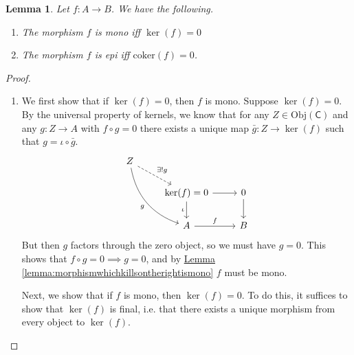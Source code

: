 \documentclass[a4paper,10pt]{scrreprt}
\newcommand{\Obj}{\mathrm{Obj}}
\newcommand{\coker}{\mathrm{coker}}
\theoremstyle{definition}
\theoremstyle{plain}
\newtheorem{lemma}{Lemma}[section]
\theoremstyle{remark}
\begin{document}
\begin{lemma}
  \label{lemma:monoifkernelzeroepiifcokerzero}
  Let $f\colon A \to B$. We have the following. 
  \begin{enumerate}
    \item The morphism $f$ is mono iff $\ker(f) = 0$ \label{part:monoifkernelzeroepiifcokerzero1}
    \item The morphism $f$ is epi iff $\coker(f) = 0$. \label{part:monoifkernelzeroepiifcokerzero2}
  \end{enumerate}
\end{lemma}
\begin{proof}
  $\,$
  \begin{enumerate}
    \item We first show that if $\ker(f) = 0$, then $f$ is mono. Suppose $\ker(f) = 0$. By the universal property of kernels, we know that for any $Z \in \Obj(\mathsf{C})$ and any $g\colon Z \to A$ with $f \circ g = 0$ there exists a unique map $\bar{g}\colon Z \to \ker(f)$ such that $g = \iota \circ \bar{g}$.
      \begin{equation*}
        \begin{tikzcd}
          Z
          \arrow[rdd, bend right, swap, "g"]
          \arrow[rd, dashed, "\exists!g"]
          \\
          & \ker(f) = 0
          \arrow[r]
          \arrow[d, swap, "\iota"]
          & 0
          \arrow[d]
          \\
          & A
          \arrow[r, "f"]
          & B
        \end{tikzcd}
      \end{equation*}
      But then $g$ factors through the zero object, so we must have $g = 0$. This shows that $f \circ g = 0 \implies g = 0$, and by \hyperref[lemma:morphismwhichkillsontherightismono]{Lemma \ref*{lemma:morphismwhichkillsontherightismono}} $f$ must be mono.

      Next, we show that if $f$ is mono, then $\ker(f) = 0$. To do this, it suffices to show that $\ker(f)$ is final, i.e. that there exists a unique morphism from every object to $\ker(f)$.


\end{enumerate}
\end{proof}
\end{document}
